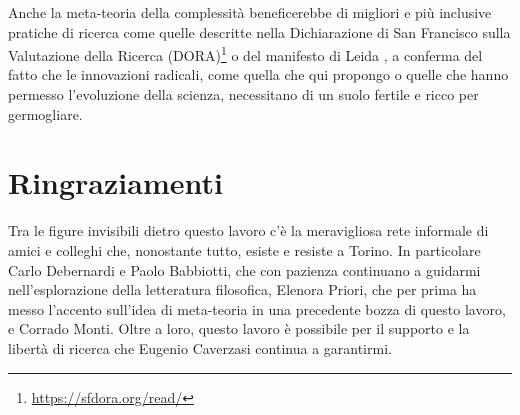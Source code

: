 \documentclass[a4paper, headings=standardclasses]{scrartcl}
\begin{document}
Anche la meta-teoria della complessità beneficerebbe di migliori e più inclusive pratiche di ricerca come quelle descritte nella Dichiarazione di San Francisco sulla Valutazione della Ricerca (DORA)\footnote{\url{https://sfdora.org/read/}} o del manifesto di Leida \parencite{hicks2015}, a conferma del fatto che le innovazioni radicali, come quella che qui propongo o quelle che hanno permesso l'evoluzione della scienza, necessitano di un suolo fertile e ricco per germogliare.

\section*{Ringraziamenti}
Tra le figure invisibili dietro questo lavoro c'è la meravigliosa rete informale di amici e colleghi che, nonostante tutto, esiste e resiste a Torino. In particolare Carlo Debernardi e Paolo Babbiotti, che con pazienza continuano a guidarmi nell'esplorazione della letteratura filosofica, Elenora Priori, che per prima ha messo l'accento sull'idea di meta-teoria in una precedente bozza di questo lavoro, e Corrado Monti.
Oltre a loro, questo lavoro è possibile per il supporto e la libertà di ricerca che Eugenio Caverzasi continua a garantirmi.

\begin{refcontext}[sorting=nyt]
	\printbibliography
\end{refcontext}
\end{document}
